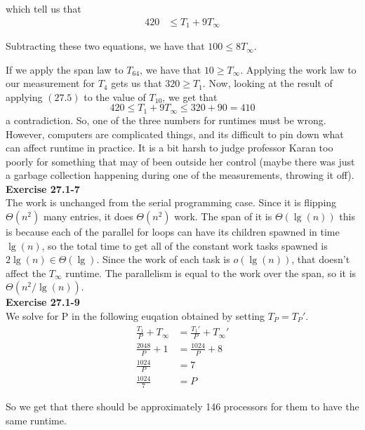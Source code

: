 \documentclass{article}
\begin{document}
which tell us that 
\begin{align*}
420 &\le T_1 +9 T_\infty
\end{align*}


Subtracting these two equations, we have that $100 \le 8 T_\infty$.

If we apply the span law to $T_64$, we have that $10\ge T_\infty$. Applying the work law to our measurement for $T_4$ gets us that $320 \ge  T_1$. Now, looking at the result of applying $(27.5)$ to the value of $T_10$, we get that
\[
420 \le T_1 + 9T_\infty \le 320 + 90 = 410
\]
a contradiction. So, one of the three numbers for runtimes must be wrong. However, computers are complicated things, and its difficult to pin down what can affect runtime in practice. It is a bit harsh to judge professor Karan too poorly for something that may of been outside her control (maybe there was just a garbage collection happening during one of the measurements, throwing it off).\\



\noindent\textbf{Exercise 27.1-7}\\
The work is unchanged from the serial programming case. Since it is flipping $\Theta(n^2)$ many entries, it does $\Theta(n^2)$ work. The span of it is $\Theta(\lg(n))$ this is because each of the parallel for loops can have its children spawned in time $\lg(n)$, so the total time to get all of the constant work tasks spawned is $2\lg(n) \in \Theta(\lg)$. Since the work of each task is $o(\lg(n))$, that doesn't affect the $T_\infty$ runtime. The parallelism is equal to the work over the span, so it is $\Theta(n^2/\lg(n))$.\\



\noindent\textbf{Exercise 27.1-9}\\
We solve for P in the following euqation obtained by setting $T_P = T_P'$.
\begin{align*}
\frac{T_1}{P}+T_\infty &= \frac{T_1'}{P} + T_\infty'\\
\frac{2048}{P} + 1 &= \frac{1024}{P}+8\\
\frac{1024}{P} &= 7\\
\frac{1024}{7} &=P
\end{align*}

So we get that there should be approximately 146 processors for them to have the same runtime.\\
\end{document}
